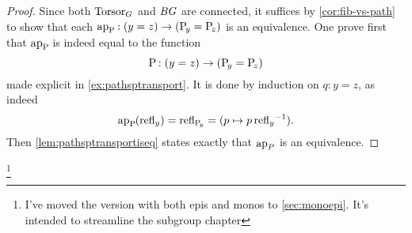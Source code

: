 \begin{proof}
  Since both $\mathrm{Torsor}_G$ and $\mathit{B}\mathit{G}$ are connected, it suffices by
  \cref{cor:fib-vs-path} to show that each
  $\ap {\pathsp{}}:(y=z)\to(\pathsp y=\pathsp z)$ is an
  equivalence. One prove first that $\ap {\pathsp{}}$ is indeed equal
  to the function
  $$\mathrm{P}_{\!}:(y=z)\to(\mathrm{P}_{\!y}= \mathrm{P}_{\!z})$$
  made explicit in \cref{ex:pathsptransport}. It is done by induction
  on $q:y=z$, as indeed
  \begin{displaymath}
    \ap {\pathsp{}}(\refl y) = \refl {\pathsp y} = (p\mapsto p\inv{\refl y}).
  \end{displaymath}
  Then \cref{lem:pathsptransportiseq} states exactly that $\ap P$ is
  an equivalence.
%
%

\end{proof}

\footnote{I've moved the version with both epis and monos to \cref{sec:monoepi}.  
  It's intended to streamline the subgroup chapter}


